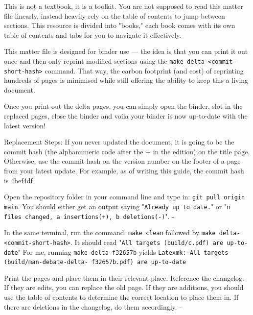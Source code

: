 
This is not a textbook, it is a toolkit. You are not supposed to read this matter file linearly, instead heavily rely on the table of contents to jump between sections. This resource is divided into "books," each book comes with its own table of contents and tabs for you to navigate it effectively.


This matter file is designed for binder use --- the idea is that you can print it out once and then only reprint modified sections using the \texttt{make delta-<commit-short-hash>} command. 
That way, the carbon footprint (and cost) of reprinting hundreds of pages is minimised while still offering the ability to keep this a living document.

Once you print out the delta pages, you can simply open the binder, slot in the replaced pages, close the binder and voila your binder is now up-to-date with the latest version!
\begin{checklist}{Replacement Steps:}
           {If you never updated the document, it is going to be the commit hash (the alphanumeric code after the + in the edition) on the title page. Otherwise, use the commit hash on the version number on the footer of a page from your latest update.}
           {For example, as of writing this guide, the commit hash is 4bef4df}

           {Open the repository folder in your command line and type in: \texttt{git pull origin main}. You should either get an output saying "\texttt{Already up to date.}" or "\texttt{n files changed, a insertions(+), b deletions(-)}".}
           {-}

           {In the same terminal, run the command: \texttt{make clean} followed by \texttt{make delta-<commit-short-hash>}. It should read "\texttt{All targets (build/c.pdf) are up-to-date}"}
           {For me, running \texttt{make delta-f32657b} yields \texttt{Latexmk: All targets (build/man-debate-delta- f32657b.pdf) are up-to-date}}

           {Print the pages and place them in their relevant place. Reference the changelog. If they are edits, you can replace the old page. If they are additions, you should use the table of contents to determine the correct location to place them in. If there are deletions in the changelog, do them accordingly.}
           {-}
\end{checklist}

